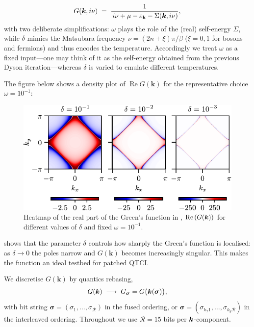 \begin{equation}
  G(\boldsymbol{k},i\nu)
  \;=\;
  \frac{1}
       {\,i\nu+\mu-\varepsilon_{\mathbf{k}}-\Sigma(\boldsymbol{k},i\nu)},
\end{equation}
with two deliberate simplifications:
\(\omega\) plays the role of the (real) self-energy
\(\Sigma\), while \(\delta\) mimics the Matsubara frequency
\(\nu=(2n+\xi)\pi/\beta\) ($\xi=0,1$ for bosons and fermions) and thus encodes the temperature.
Accordingly we treat \(\omega\) as a fixed input—one may think of it as the self-energy obtained from the previous Dyson iteration—whereas \(\delta\) is varied to emulate different temperatures.

The figure below shows a density plot of
\(\operatorname{Re}G(\mathbf{k})\) for the representative choice
\(\omega=10^{-1}\):

\begin{figure}[ht!]
    \centering
    \includegraphics{figures/realGreenHeatmap.pdf}
    \caption{Heatmap of the real part of the Green's function in , $\text{Re}\left(G(\boldsymbol{k})\right)$ for different values of $\delta$ and fixed $\omega=10^{-1}$. }
    \label{fig:realGreenHeatmap}
\end{figure}

 shows that the parameter \(\delta\) controls how sharply the Green’s function is localised: as \(\delta\to 0\) the poles narrow and \(G(\mathbf{k})\) becomes increasingly singular.  This makes the function an ideal testbed for patched QTCI.

We discretise \(G(\mathbf{k})\) by quantics rebasing,  
\begin{equation}
  G(\boldsymbol{k})
  \;\longrightarrow\;
  G_{\boldsymbol{\sigma}} = G \bigl(\boldsymbol{k}(\boldsymbol{\sigma})\bigr),
\end{equation}
with bit string
\(\boldsymbol{\sigma}=(\sigma_{1},\dots,\sigma_{\mathcal R})\) in the fused
ordering, or \(\boldsymbol{\sigma}=(\sigma_{k_x1},\dots,\sigma_{k_y\mathcal R})\) in the interleaved ordering.  
Throughout we use \(\mathcal R=15\) bits per \(\boldsymbol{k}\)-component.

